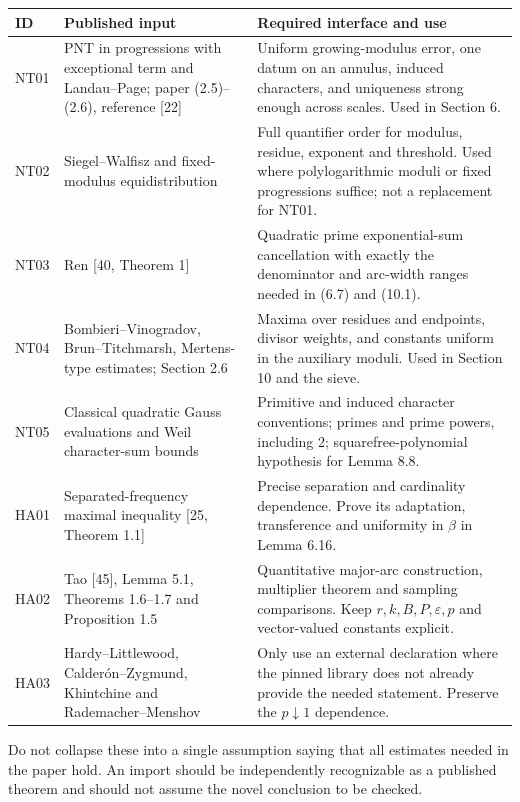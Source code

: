 \documentclass[11pt]{article}
\begin{document}
\small
\begin{longtable}{p{.11\linewidth}p{.39\linewidth}p{.41\linewidth}}
\toprule
ID & Published input & Required interface and use\\\midrule
NT01 & PNT in progressions with exceptional term and Landau--Page; paper (2.5)--(2.6), reference [22] &
Uniform growing-modulus error, one datum on an annulus, induced characters, and
uniqueness strong enough across scales. Used in Section 6.\\
NT02 & Siegel--Walfisz and fixed-modulus equidistribution &
Full quantifier order for modulus, residue, exponent and threshold. Used where
polylogarithmic moduli or fixed progressions suffice; not a replacement for NT01.\\
NT03 & Ren [40, Theorem 1] &
Quadratic prime exponential-sum cancellation with exactly the denominator and
arc-width ranges needed in (6.7) and (10.1).\\
NT04 & Bombieri--Vinogradov, Brun--Titchmarsh, Mertens-type estimates; Section 2.6 &
Maxima over residues and endpoints, divisor weights, and constants uniform in
the auxiliary moduli. Used in Section 10 and the sieve.\\
NT05 & Classical quadratic Gauss evaluations and Weil character-sum bounds &
Primitive and induced character conventions; primes and prime powers, including
2; squarefree-polynomial hypothesis for Lemma 8.8.\\
HA01 & Separated-frequency maximal inequality [25, Theorem 1.1] &
Precise separation and cardinality dependence. Prove its adaptation, transference
and uniformity in \(\beta\) in Lemma 6.16.\\
HA02 & Tao [45], Lemma 5.1, Theorems 1.6--1.7 and Proposition 1.5 &
Quantitative major-arc construction, multiplier theorem and sampling comparisons.
Keep \(r,k,B,P,\varepsilon,p\) and vector-valued constants explicit.\\
HA03 & Hardy--Littlewood, Calder\'on--Zygmund, Khintchine and Rademacher--Menshov &
Only use an external declaration where the pinned library does not already
provide the needed statement. Preserve the \(p\downarrow1\) dependence.\\
\bottomrule
\end{longtable}
\normalsize

Do not collapse these into a single assumption saying that all estimates needed
in the paper hold. An import should be independently recognizable as a published
theorem and should not assume the novel conclusion to be checked.
\end{document}
